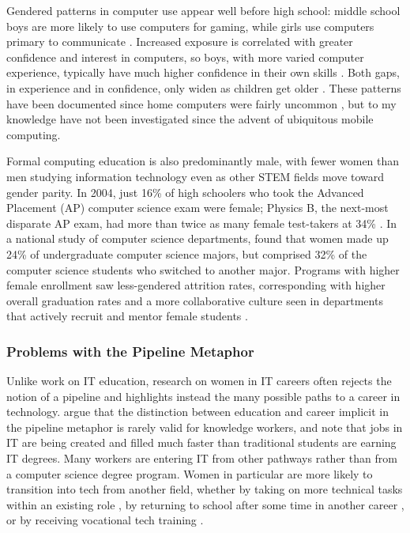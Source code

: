Gendered patterns in computer use appear well before high school: middle school boys are more likely to use computers for gaming, while girls use computers primary to communicate \citep{BarkerAspray2006State}. Increased exposure is correlated with greater confidence and interest in computers, so boys, with more varied computer experience, typically have much higher confidence in their own skills \citep{FrantomEtAl2002Measure}. Both gaps, in experience and in confidence, only widen as children get older \citep{FitzpatrickHardman2000Mediated}. These patterns have been documented since home computers were fairly uncommon \citep{JonesClarke1995Diversity}, but to my knowledge have not been investigated since the advent of ubiquitous mobile computing.

Formal computing education is also predominantly male, with fewer women than men studying information technology even as other STEM fields move toward gender parity. In 2004, just 16\% of high schoolers who took the Advanced Placement (AP) computer science exam were female; Physics B, the next-most disparate AP exam, had more than twice as many female test-takers at 34\% \citep{BarkerAspray2006State}. In a national study of computer science departments, \citet{Cohoon2006Just} found that women made up 24\% of undergraduate computer science majors, but comprised 32\% of the computer science students who switched to another major. Programs with higher female enrollment saw less-gendered attrition rates, corresponding with higher overall graduation rates and a more collaborative culture seen in departments that actively recruit and mentor female students \citep{MargolisFisher2002Unlocking}.

\subsubsection{Problems with the Pipeline Metaphor}
Unlike work on IT education, research on women in IT careers often rejects the notion of a pipeline and highlights instead the many possible paths to a career in technology. \citet{BartolAspray2006Transition} argue that the distinction between education and career implicit in the pipeline metaphor is rarely valid for knowledge workers, and note that jobs in IT are being created and filled much faster than traditional students are earning IT degrees. Many workers are entering IT from other pathways rather than from a computer science degree program. Women in particular are more likely to transition into tech from another field, whether by taking on more technical tasks within an existing role \citep{vonHellensEtAl2001Breaking}, by returning to school after some time in another career \citep{Jesse2006Poverty}, or by receiving vocational tech training \citep{Chapple2006Foot}.

